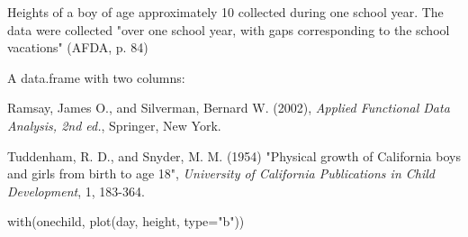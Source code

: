 \begin{Description}\relax
Heights of a boy of age approximately 10 collected during one school
year.  The data were collected "over one school year, with gaps
corresponding to the school vacations" (AFDA, p. 84)
\end{Description}
\begin{Format}\relax
A data.frame with two columns:  
\end{Format}
\begin{Source}\relax
Ramsay, James O., and Silverman, Bernard W. (2002), \emph{Applied
Functional Data Analysis, 2nd ed.}, Springer, New York. 

Tuddenham, R. D., and Snyder, M. M. (1954) "Physical growth of
California boys and girls from birth to age 18", \emph{University of
California Publications in Child Development}, 1, 183-364.
\end{Source}
\begin{Examples}
\begin{ExampleCode}
with(onechild, plot(day, height, type="b"))

\end{ExampleCode}
\end{Examples}

